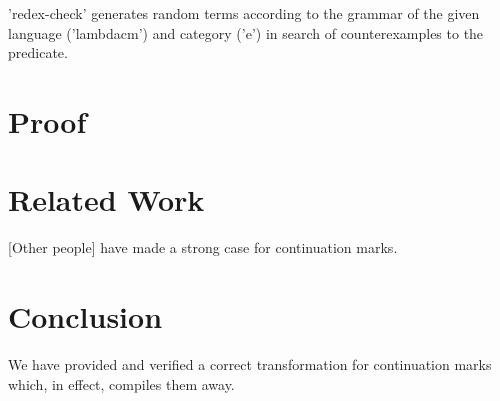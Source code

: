 \documentclass{llncs}
\begin{document}
\scheme'redex-check' generates random terms according to the grammar of the given language (\scheme'lambdacm') and category (\scheme'e') in search of counterexamples to the predicate. 

\section{Proof}




\section{Related Work}

[Other people] have made a strong case for continuation marks.

\section{Conclusion}

We have provided and verified a correct transformation for continuation marks which, in effect, compiles them away.



\end{document}
